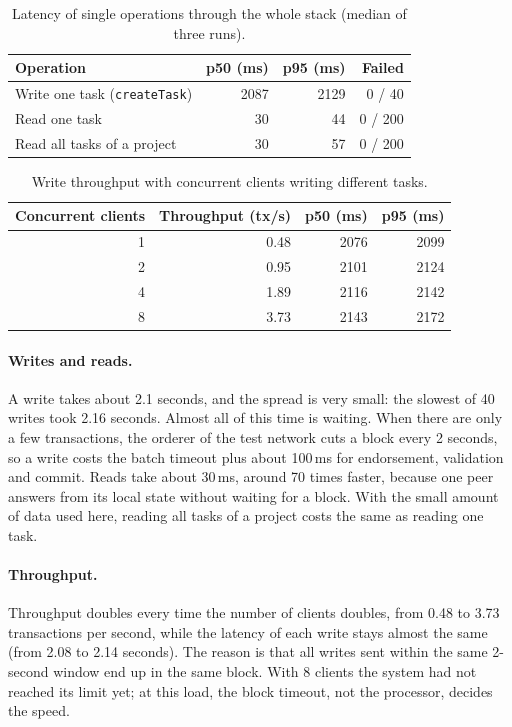 \begin{table}[htbp]
    \centering
    \small
    \begin{tabular}{lrrr}
        \toprule
        Operation & p50 (ms) & p95 (ms) & Failed \\
        \midrule
        Write one task (\texttt{createTask}) & 2087 & 2129 & 0 / 40 \\
        Read one task & 30 & 44 & 0 / 200 \\
        Read all tasks of a project & 30 & 57 & 0 / 200 \\
        \bottomrule
    \end{tabular}
    \caption{Latency of single operations through the whole stack (median of three runs).}
    \label{tab:benchmark}
\end{table}

\begin{table}[htbp]
    \centering
    \small
    \begin{tabular}{rrrr}
        \toprule
        Concurrent clients & Throughput (tx/s) & p50 (ms) & p95 (ms) \\
        \midrule
        1 & 0.48 & 2076 & 2099 \\
        2 & 0.95 & 2101 & 2124 \\
        4 & 1.89 & 2116 & 2142 \\
        8 & 3.73 & 2143 & 2172 \\
        \bottomrule
    \end{tabular}
    \caption{Write throughput with concurrent clients writing different tasks.}
    \label{tab:throughput}
\end{table}

\paragraph*{Writes and reads.} A write takes about 2.1 seconds, and the spread is very small: the slowest of 40 writes took 2.16 seconds. Almost all of this time is waiting. When there are only a few transactions, the orderer of the test network cuts a block every 2 seconds, so a write costs the batch timeout plus about 100\,ms for endorsement, validation and commit. Reads take about 30\,ms, around 70 times faster, because one peer answers from its local state without waiting for a block. With the small amount of data used here, reading all tasks of a project costs the same as reading one task.

\paragraph*{Throughput.} Throughput doubles every time the number of clients doubles, from 0.48 to 3.73 transactions per second, while the latency of each write stays almost the same (from 2.08 to 2.14 seconds). The reason is that all writes sent within the same 2-second window end up in the same block. With 8 clients the system had not reached its limit yet; at this load, the block timeout, not the processor, decides the speed.

